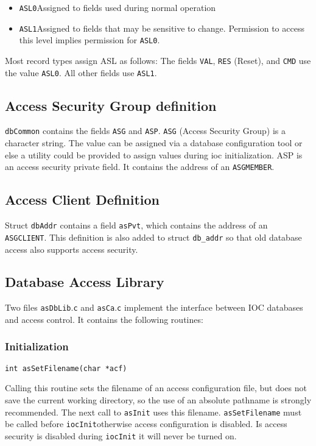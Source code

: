\begin{itemize}\item \verb|ASL0|Assigned to fields used during normal operation

\item \verb|ASL1|Assigned to fields that may be sensitive to change. Permission to access this level implies permission for 
\verb|ASL0|.

\end{itemize}
Most record types assign ASL as follows: The fields \verb|VAL|, \verb|RES| (Reset), and \verb|CMD| use the value \verb|ASL0|. All other fields use 
\verb|ASL1|.

\subsection{Access Security Group definition}

\verb|dbCommon| contains the fields \verb|ASG| and \verb|ASP|. \verb|ASG| (Access Security Group) is a character string. The value can be 
assigned via a database configuration tool or else a utility could be provided to assign values during ioc initialization. ASP 
is an access security private field. It contains the address of an \verb|ASGMEMBER|.

\subsection{Access Client Definition}

Struct \verb|dbAddr| contains a field \verb|asPvt|, which contains the address of an \verb|ASGCLIENT|. This definition is also added to 
struct \verb|db_addr| so that old database access also supports access security. 

\subsection{Database Access Library}

Two files \verb|asDbLib|.\verb|c| and \verb|asCa|.\verb|c| implement the interface between IOC databases and access control. It contains the 
following routines:

\subsubsection{Initialization}

\begin{verbatim}int asSetFilename(char *acf)
\end{verbatim}Calling this routine sets the filename of an access configuration file, but does not save the current working directory, so 
the use of an absolute pathname is strongly recommended. The next call to \verb|asInit| uses this filename. 
\verb|asSetFilename| must be called before \verb|iocInit|otherwise access configuration is disabled. Is access security is 
disabled during \verb|iocInit| it will never be turned on.

